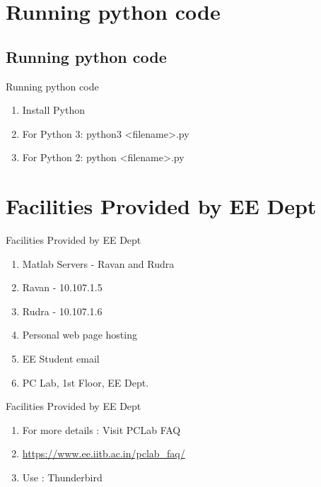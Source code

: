 \documentclass{beamer}
\newcounter{saveenumi}
\newcommand{\seti}{\setcounter{saveenumi}{\value{enumi}}}
\newcommand{\conti}{\setcounter{enumi}{\value{saveenumi}}}
\begin{document}
\section{Running python code}
{
	\subsection{Running python code}
	\begin{frame}{Running python code}
		\begin{enumerate}
		\item<2-> Install Python
		\item<3-> For Python 3: python3 <filename>.py
		\item<3-> For Python 2: python <filename>.py
			\end{enumerate}
	\end{frame}		
}

\section{Facilities Provided by EE Dept}
{
\begin{frame}{Facilities Provided by EE Dept}
	\begin{enumerate}
		\item<2-> Matlab Servers - Ravan and Rudra
		\item<2-> Ravan - 10.107.1.5
		\item<2-> Rudra - 10.107.1.6
		\item<3-> Personal web page hosting								\item<4-> EE Student email
		\item<5-> PC Lab, 1st Floor, EE Dept.
		\seti
	\end{enumerate}
\end{frame}

\begin{frame}{Facilities Provided by EE Dept}
	\begin{enumerate}
		\conti
		\item<2-> For more details : Visit PCLab FAQ
		\item<2-> \url{https://www.ee.iitb.ac.in/pclab_faq/}
		\item<3-> Use : Thunderbird
	\end{enumerate}
\end{frame}
}
\end{document}
